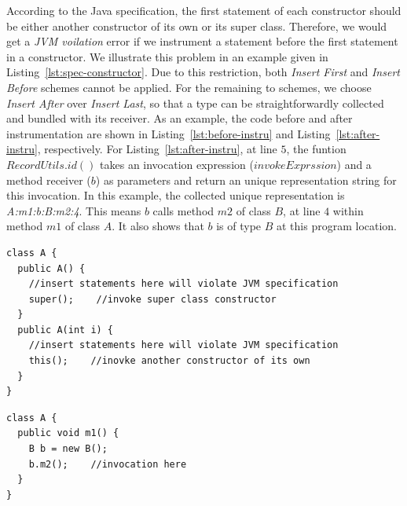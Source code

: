 \documentclass{fac}
\begin{document}
According to the Java specification, the first statement of each constructor should be either another constructor of its own or its super class. Therefore, we would get a \emph{JVM voilation} error if we instrument a statement before the first statement in a constructor. We illustrate this problem in an example given in Listing~\ref{lst:spec-constructor}. Due to this restriction, both \emph{Insert First} and \emph{Insert Before} schemes cannot be applied. For the remaining to schemes, we choose \emph{Insert After} over \emph{Insert Last}, so that a type can be straightforwardly collected and bundled with its receiver. %
As an example, the code before and after instrumentation are shown in Listing~\ref{lst:before-instru} and Listing~\ref{lst:after-instru}, respectively. For Listing~\ref{lst:after-instru}, at line $5$, the funtion $RecordUtils.id()$ takes an invocation expression ($invokeExprssion$) and a method receiver ($b$) as parameters and return an unique representation string for this invocation. In this example, the collected unique representation is \emph{A:m1:b:B:m2:4}. This means $b$ calls method $m2$ of class $B$, at line $4$ within method $m1$ of class $A$. It also shows that $b$ is of type $B$ at this program location.

\begin{minipage}{\linewidth}
\vspace{10pt}
\begin{lstlisting}[caption={Java specification on constructor},label={lst:spec-constructor}]
class A {
  public A() {
    //insert statements here will violate JVM specification
    super();	//invoke super class constructor
  }
  public A(int i) {
    //insert statements here will violate JVM specification
    this();    //inovke another constructor of its own
  }
}
\end{lstlisting}
\end{minipage}

\begin{minipage}{\linewidth}
\vspace{10pt}
\begin{lstlisting}[caption={Example code before instrumentation},label={lst:before-instru}]
class A {
  public void m1() {
    B b = new B();
    b.m2();    //invocation here
  }
}
\end{lstlisting}
\end{minipage}
\end{document}
